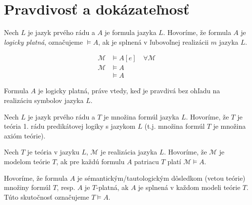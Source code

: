 \section{Pravdivosť a dokázateľnosť}
\startFIXME

\begin{definicia}
    Nech $L$ je jazyk prvého rádu a $A$ je formula jazyka
    $L$. Hovoríme, že formula $A$ je \emph{logicky platná},
    označujeme $\models A$,
    ak je splnená v ľubovoľnej realizácii $m$ jazyka $L$.

    \begin{align*}
        \mathcal{M} & \models A[e] \quad \forall \mathcal{M} \\
        \mathcal{M} & \models A \\
        & \models A
    \end{align*}
\end{definicia}

\begin{poznamka}
    Formula $A$ je logicky platná, práve vtedy, keď je pravdivá
    bez ohľadu na realizáciu symbolov jazyka $L$.
\end{poznamka}

\begin{definicia}[Teória]
    Nech $L$ je jazyk prvého rádu a $T$ je množina formúl
    jazyka $L$. Hovoríme, že $T$ je teória 1. rádu predikátovej logiky
    s jazykom $L$ (t.j. množina formúl $T$ je množina axióm teórie).
\end{definicia}

\begin{definicia}
    Nech $T$ je teória v jazyku $L$, $\mathcal{M}$ je realizácia jazyka $L$.
    Hovoríme, že $\mathcal{M}$ je modelom teórie $T$, ak pre každú formulu $A$
    patriacu $T$ platí $\mathcal{M} \models A$.
\end{definicia}

\begin{definicia}
    Hovoríme, že formula $A$ je
    sémantickým/tautologickým dôsledkom (vetou teórie) množiny formúl $T$,
    resp. $A$ je $T$-platná, ak $A$ je splnená v každom modeli teórie $T$.
    Túto skutočnosť označujeme $T \models A$.
\end{definicia}

